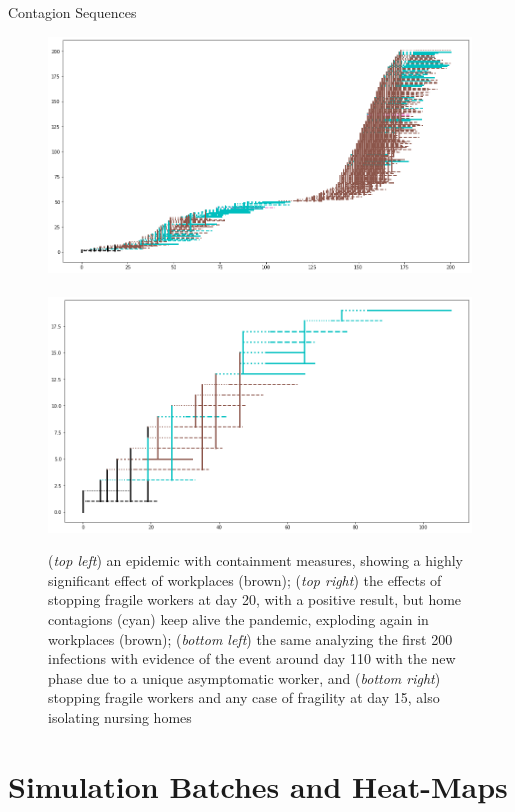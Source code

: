 \documentclass[8pt]{beamer}
\begin{document}
\begin{frame}{Contagion Sequences}
\begin{figure}[H]
\center
\includegraphics[scale=0.105]{withShort1A200.png}~~~~~~~~~~~\includegraphics[scale=0.105]{withShort1B.png} \\
\caption{(\emph{top left}) an epidemic with containment measures, showing a highly significant effect of workplaces (brown);
 (\emph{top right}) the effects of stopping fragile workers at day 20, with a positive result, but home contagions (cyan) keep alive the pandemic, exploding again in workplaces (brown); (\emph{bottom left}) the same analyzing the first 200 infections with evidence of the event around day 110 with the new phase due to a unique asymptomatic worker, and (\emph{bottom right}) stopping fragile workers and any case of fragility at day 15, also isolating nursing homes} 
\label{fourSequences}
\end{figure}

\end{frame}

\section{Simulation Batches and Heat-Maps}
\end{document}
